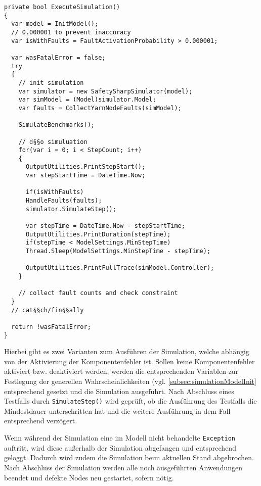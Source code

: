 \begin{lstlisting}[label=lst:hadoopSimulation,style=cs,
caption={[Ausführung der Simulation]
    Ausführung der Simulation (gekürzt).}]
private bool ExecuteSimulation()
{
  var model = InitModel();
  // 0.000001 to prevent inaccuracy
  var isWithFaults = FaultActivationProbability > 0.000001;
  
  var wasFatalError = false;
  try
  {
    // init simulation
    var simulator = new SafetySharpSimulator(model);
    var simModel = (Model)simulator.Model;
    var faults = CollectYarnNodeFaults(simModel);
    
    SimulateBenchmarks();
    
    // d§§o simuluation
    for(var i = 0; i < StepCount; i++)
    {
      OutputUtilities.PrintStepStart();
      var stepStartTime = DateTime.Now;
      
      if(isWithFaults)
      HandleFaults(faults);
      simulator.SimulateStep();
      
      var stepTime = DateTime.Now - stepStartTime;
      OutputUtilities.PrintDuration(stepTime);
      if(stepTime < ModelSettings.MinStepTime)
      Thread.Sleep(ModelSettings.MinStepTime - stepTime);
      
      OutputUtilities.PrintFullTrace(simModel.Controller);
    }
    
    // collect fault counts and check constraint
  }
  // cat§§ch/fin§§ally
  
  return !wasFatalError;
}
\end{lstlisting}

Hierbei gibt es zwei Varianten zum Ausführen der Simulation, welche abhängig von der Aktivierung der Komponentenfehler ist.
Sollen keine Komponentenfehler aktiviert bzw. deaktiviert werden, werden die entsprechenden Variablen zur Festlegung der generellen Wahrscheinlichkeiten (vgl. \cref{subsec:simulationModelInit} entsprechend gesetzt und die Simulation ausgeführt.
Nach Abschluss eines Testfalls durch \texttt{SimulateStep()} wird geprüft, ob die Ausführung des Testfalls die Mindestdauer unterschritten hat und die weitere Ausführung in dem Fall entsprechend verzögert.

Wenn während der Simulation eine im Modell nicht behandelte \texttt{Exception} auftritt, wird diese außerhalb der Simulation abgefangen und entsprechend geloggt.
Dadurch wird zudem die Simulation beim aktuellen Stand abgebrochen.
Nach Abschluss der Simulation werden alle noch ausgeführten Anwendungen beendet und defekte Nodes neu gestartet, sofern nötig.

